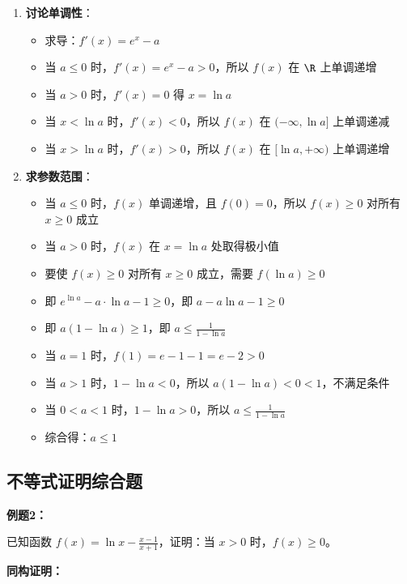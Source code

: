 \documentclass[a4paper,11pt]{ctexrep}
\newcommand{\exampleicon}{\ModeBadge[highlight]{例题}}
\newcommand{\analysisicon}{\ModeBadge[secondary]{分析}}
\theoremstyle{definition}
\begin{document}
\begin{enumerate}
    \item \textbf{讨论单调性}：
    \begin{itemize}
        \item 求导：$f'(x) = e^x - a$
        \item 当 $a \leq 0$ 时，$f'(x) = e^x - a > 0$，所以 $f(x)$ 在 $\R$ 上单调递增
        \item 当 $a > 0$ 时，$f'(x) = 0$ 得 $x = \ln a$
        \item 当 $x < \ln a$ 时，$f'(x) < 0$，所以 $f(x)$ 在 $(-\infty, \ln a]$ 上单调递减
        \item 当 $x > \ln a$ 时，$f'(x) > 0$，所以 $f(x)$ 在 $[\ln a, +\infty)$ 上单调递增
    \end{itemize}
    
    \item \textbf{求参数范围}：
    \begin{itemize}
        \item 当 $a \leq 0$ 时，$f(x)$ 单调递增，且 $f(0) = 0$，所以 $f(x) \geq 0$ 对所有 $x \geq 0$ 成立
        \item 当 $a > 0$ 时，$f(x)$ 在 $x = \ln a$ 处取得极小值
        \item 要使 $f(x) \geq 0$ 对所有 $x \geq 0$ 成立，需要 $f(\ln a) \geq 0$
        \item 即 $e^{\ln a} - a \cdot \ln a - 1 \geq 0$，即 $a - a\ln a - 1 \geq 0$
        \item 即 $a(1 - \ln a) \geq 1$，即 $a \leq \frac{1}{1 - \ln a}$
        \item 当 $a = 1$ 时，$f(1) = e - 1 - 1 = e - 2 > 0$
        \item 当 $a > 1$ 时，$1 - \ln a < 0$，所以 $a(1 - \ln a) < 0 < 1$，不满足条件
        \item 当 $0 < a < 1$ 时，$1 - \ln a > 0$，所以 $a \leq \frac{1}{1 - \ln a}$
        \item 综合得：$a \leq 1$
    \end{itemize}
\end{enumerate}

\subsection{不等式证明综合题}

\exampleicon \textbf{例题2：}

已知函数 $f(x) = \ln x - \frac{x-1}{x+1}$，证明：当 $x > 0$ 时，$f(x) \geq 0$。

\analysisicon \textbf{同构证明：}
\end{document}
